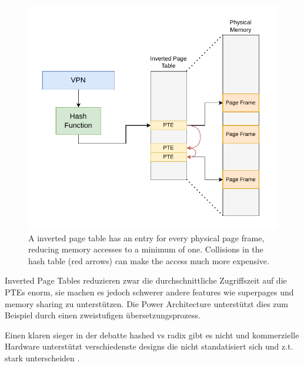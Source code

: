 \begin{figure}[t]
    \centering
    \includegraphics[scale=1]{figures/inverted_pt.pdf}
    \caption[Simple Inverted Page Table Design]{A inverted page table has an entry for every physical
        page frame, reducing memory accesses to a minimum of one. Collisions in the hash table (red arrows) can
        make the access much more expensive. }
    \label{fig:fund:inverted}
\end{figure}

Inverted Page Tables reduzieren zwar die durchschnittliche Zugriffszeit auf die PTEs enorm, sie machen
es jedoch schwerer andere features wie superpages und memory sharing zu unterstützen.
Die Power Architecture unterstützt dies zum Beispiel durch einen zweistufigen übersetzungsprozess\cite{yaniv2016hash}.





Einen klaren sieger in der debatte hashed vs radix  gibt es nicht
und kommerzielle Hardware unterstützt verschiedenste designs die nicht standatisiert sich und z.t.
stark unterscheiden \cite{jacob1998look}.

